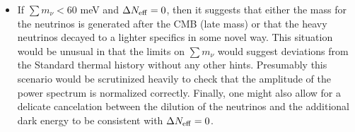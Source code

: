 \begin{itemize}
\item If $\sum m_\nu < 60$ meV and $\Delta N_{\rm eff} = 0$, then it suggests that either the mass for the neutrinos is generated after the CMB (late mass) or that the heavy neutrinos decayed to a lighter specifics in some novel way.  This situation would be unusual in that the limits on $\sum m_\nu$ would suggest deviations from the Standard thermal history without any other hints.  Presumably this scenario would be scrutinized heavily to check that the amplitude of the power spectrum is normalized correctly.  Finally, one might also allow for a delicate cancelation between the dilution of the neutrinos and the additional dark energy to be consistent with $\Delta N_{\rm eff} =0$.




\end{itemize}







